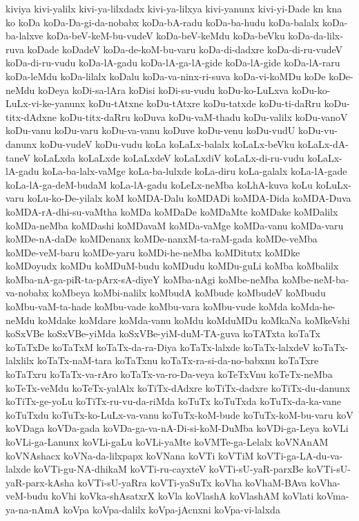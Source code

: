 {kiviya
kivi-yalilx
kivi-ya-lilxdadx
kivi-ya-lilxya
kivi-yanunx
kivi-yi-Dade
kn
kna
ko
koDa
koDa-Da-gi-da-nobabx
koDa-bA-radu
koDa-ba-hudu
koDa-balalx
koDa-ba-lalxve
koDa-beV-keM-bu-vudeV
koDa-beV-keMdu
koDa-beVku
koDa-da-lilx-ruva
koDade
koDadeV
koDa-de-koM-bu-varu
koDa-di-dadxre
koDa-di-ru-vudeV
koDa-di-ru-vudu
koDa-lA-gadu
koDa-lA-ga-lA-gide
koDa-lA-gide
koDa-lA-raru
koDa-leMdu
koDa-lilalx
koDalu
koDa-va-ninx-ri-suva
koDa-vi-koMDu
koDe
koDe-neMdu
koDeya
koDi-sa-lAra
koDisi
koDi-su-vudu
koDu-ko-LuLxva
koDu-ko-LuLx-vi-ke-yanunx
koDu-tAtxne
koDu-tAtxre
koDu-tatxde
koDu-ti-daRru
koDu-titx-dAdxne
koDu-titx-daRru
koDuva
koDu-vaM-thadu
koDu-valilx
koDu-vanoV
koDu-vanu
koDu-varu
koDu-va-vanu
koDuve
koDu-venu
koDu-vudU
koDu-vu-danunx
koDu-vudeV
koDu-vudu
koLa
koLaLx-balalx
koLaLx-beVku
koLaLx-dA-taneV
koLaLxda
koLaLxde
koLaLxdeV
koLaLxdiV
koLaLx-di-ru-vudu
koLaLx-lA-gadu
koLa-ba-lalx-vaMge
koLa-ba-lulxde
koLa-diru
koLa-galalx
koLa-lA-gade
koLa-lA-ga-deM-budaM
koLa-lA-gadu
koLeLx-neMba
koLhA-kuva
koLu
koLuLx-varu
koLu-ko-De-yilalx
koM
koMDA-Dalu
koMDADi
koMDA-Dida
koMDA-Duva
koMDA-rA-dhi-su-vaMtha
koMDa
koMDaDe
koMDaMte
koMDake
koMDalilx
koMDa-neMba
koMDashi
koMDavaM
koMDa-vaMge
koMDa-vanu
koMDa-varu
koMDe-nA-daDe
koMDenanx
koMDe-nanxM-ta-raM-gada
koMDe-veMba
koMDe-veM-baru
koMDe-yaru
koMDi-he-neMba
koMDitutx
koMDke
koMDoyudx
koMDu
koMDuM-budu
koMDudu
koMDu-guLi
koMba
koMbalilx
koMba-nA-ga-piR-ta-pArx-sA-diyeY
koMba-nAgi
koMbe-neMba
koMbe-neM-ba-va-nobabx
koMbeya
koMbi-nalilx
koMbudA
koMbude
koMbudeV
koMbudu
koMbu-vaM-ta-hade
koMbu-vade
koMbu-vara
koMbu-vude
koMda
koMda-he-neMdu
koMdake
koMdare
koMda-vanu
koMdu
koMduMDu
koMkaNa
koMkeVshi
koSxVBe
koSxVBe-yiMda
koSxVBe-yiM-duM-TA-guva
koTATxta
koTaTx
koTaTxDe
koTaTxM
koTaTx-da-ra-Diya
koTaTx-lalxde
koTaTx-lalxdeV
koTaTx-lalxlilx
koTaTx-naM-tara
koTaTxnu
koTaTx-ra-si-da-no-babxnu
koTaTxre
koTaTxru
koTaTx-va-rAro
koTaTx-va-ro-Da-veya
koTeTxVnu
koTeTx-neMba
koTeTx-veMdu
koTeTx-yalAlx
koTiTx-dAdxre
koTiTx-dadxre
koTiTx-du-danunx
koTiTx-ge-yoLu
koTiTx-ru-vu-da-riMda
koTuTx
koTuTxda
koTuTx-da-ka-vane
koTuTxdu
koTuTx-ko-LuLx-va-vanu
koTuTx-koM-bude
koTuTx-koM-bu-varu
koV
koVDaga
koVDa-gada
koVDa-ga-va-nA-Di-si-koM-DuMba
koVDi-ga-Leya
koVLi
koVLi-ga-Lanunx
koVLi-gaLu
koVLi-yaMte
koVMTe-ga-Lelalx
koVNAnAM
koVNAshacx
koVNa-da-lilxpapx
koVNana
koVTi
koVTiM
koVTi-ga-LA-du-va-lalxde
koVTi-gu-NA-dhikaM
koVTi-ru-cayxteV
koVTi-sU-yaR-parxBe
koVTi-sU-yaR-parx-kAsha
koVTi-sU-yaRra
koVTi-yaSuTx
koVha
koVhaM-BAva
koVha-veM-budu
koVhi
koVka-shAsatxrX
koVla
koVlashA
koVlashAM
koVlati
koVma-ya-na-nAmA
koVpa
koVpa-dalilx
koVpa-jAcnxni
koVpa-vi-lalxda
}
